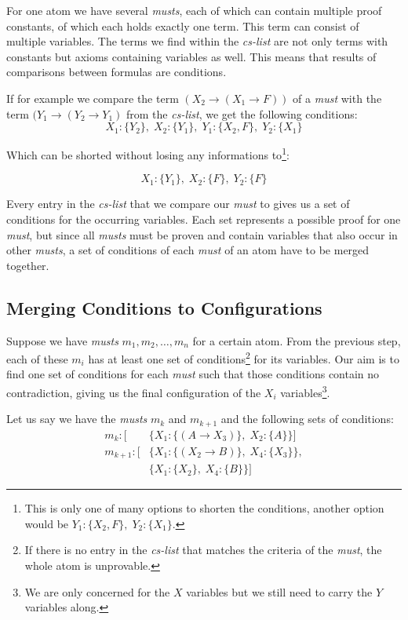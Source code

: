 For one atom we have several \emph{musts}, each of which can contain multiple proof constants, of which each holds exactly one term. This term can consist of multiple variables. The terms we find within the \emph{cs-list} are not only terms with constants but axioms containing variables as well. This means that results of comparisons between formulas are conditions. 

If for example we compare the term $(X_2 \rightarrow (X_1 \rightarrow F))$ of a \emph{must} with the term $(Y_1 \rightarrow (Y_2 \rightarrow Y_1)$ from the \emph{cs-list}, we get the following conditions:
\begin{equation*}
	X_1 : \{Y_2\},\; X_2 : \{Y_1\},\; Y_1 : \{X_2, F\},\; Y_2 : \{X_1\} 
\end{equation*}

Which can be shorted without losing any informations to\footnote{This is only one of many options to shorten the conditions, another option would be $Y_1: \{X_2, F\},\; Y_2:\{X_1\}$.}:

\begin{equation*}
	X_1 : \{Y_1\},\; X_2 : \{F\},\; Y_2 : \{F\}
\end{equation*}

Every entry in the \emph{cs-list} that we compare our \emph{must} to gives us a set of conditions for the occurring variables. Each set represents a possible proof for one \emph{must}, but since all \emph{musts} must be proven and contain variables that also occur in other \emph{musts}, a set of conditions of each \emph{must} of an atom have to be merged together.

\subsection{Merging Conditions to Configurations}
Suppose we have \emph{musts} $m_1, m_2, \dots, m_n$ for a certain atom. From the previous step, each of these $m_i$ has at least one set of conditions\footnote{If there is no entry in the \emph{cs-list} that matches the criteria of the \emph{must}, the whole atom is unprovable.} for its variables. Our aim is to find one set of conditions for each \emph{must} such that those conditions contain no contradiction, giving us the final configuration of the $X_i$ variables\footnote{We are only concerned for the $X$ variables but we still need to carry the $Y$ variables along.}.

Let us say we have the \emph{musts} $m_k$ and $m_{k+1}$ and the following sets of conditions: 
\begin{align*}
	m_k: [	& \{X_1: \{(A \rightarrow X_3)\},\; X_2: \{A\}\}]\\
	m_{k+1}: [	& \{X_1: \{(X_2 \rightarrow B)\},\; X_4: \{X_3\}\},\\
			& \{X_1: \{X_2\},\; X_4: \{B\}\}]
\end{align*}

